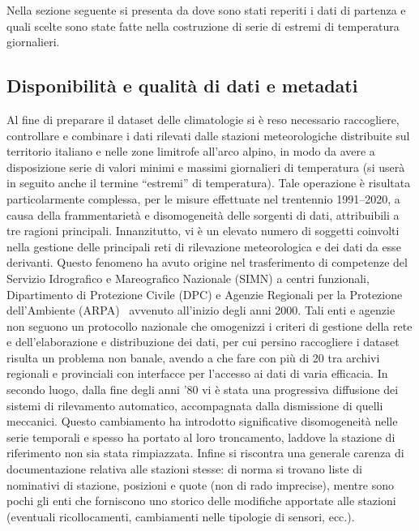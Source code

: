 
Nella sezione seguente si presenta da dove sono stati reperiti i dati di partenza e quali scelte sono state fatte nella costruzione di serie di estremi di temperatura giornalieri.

\subsection{Disponibilità e qualità di dati e metadati}
Al fine di preparare il dataset delle climatologie si è reso necessario raccogliere, controllare e combinare i dati rilevati dalle stazioni meteorologiche distribuite sul territorio italiano e nelle zone limitrofe all'arco alpino, in modo da avere a disposizione serie di valori minimi e massimi giornalieri di temperatura (si userà in seguito anche il termine ``estremi'' di temperatura). Tale operazione è risultata particolarmente complessa, per le misure effettuate nel trentennio 1991--2020, a causa della frammentarietà e disomogeneità delle sorgenti di dati, attribuibili a tre ragioni principali. Innanzitutto, vi è un elevato numero di soggetti coinvolti nella gestione delle principali reti di rilevazione meteorologica e dei dati da esse derivanti. Questo fenomeno ha avuto origine nel trasferimento di competenze del Servizio Idrografico e Mareografico Nazionale (SIMN) a centri funzionali, Dipartimento di Protezione Civile (DPC) e Agenzie Regionali per la Protezione dell'Ambiente (ARPA)~\cite{InquadramentoStoricoMonitoraggio} avvenuto all'inizio degli anni 2000. Tali enti e agenzie non seguono un protocollo nazionale che omogenizzi i criteri di gestione della rete e dell'elaborazione e distribuzione dei dati, per cui persino raccogliere i dataset risulta un problema non banale, avendo a che fare con più di 20 tra archivi regionali e provinciali con interfacce per l'accesso ai dati di varia efficacia. In secondo luogo, dalla fine degli anni '80 vi è stata una progressiva diffusione dei sistemi di rilevamento automatico, accompagnata dalla dismissione di quelli meccanici. Questo cambiamento ha introdotto significative disomogeneità nelle serie temporali e spesso ha portato al loro troncamento, laddove la stazione di riferimento non sia stata rimpiazzata. Infine si riscontra una generale carenza di documentazione relativa alle stazioni stesse: di norma si trovano liste di nominativi di stazione, posizioni e quote (non di rado imprecise), mentre sono pochi gli enti che forniscono uno storico delle modifiche apportate alle stazioni (eventuali ricollocamenti, cambiamenti nelle tipologie di sensori, ecc.).

